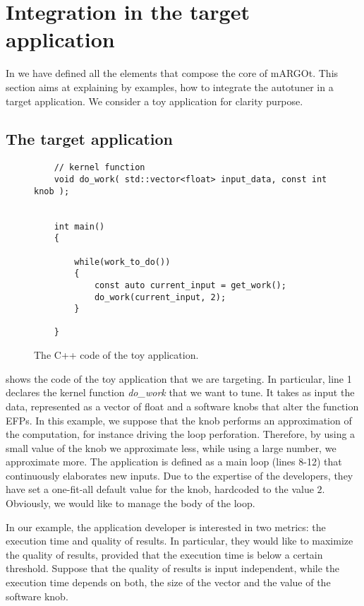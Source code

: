 \section{Integration in the target application}
\label{sec:integration}

In  we have defined all the elements that compose the core of mARGOt.
This section aims at explaining by examples, how to integrate the autotuner in a target application.
We consider a toy application for clarity purpose.

\subsection{The target application}

\begin{figure}[!t]
	\centering
	\lstset{language=MyCPP}
	\begin{lstlisting}
	// kernel function
	void do_work( std::vector<float> input_data, const int knob );
	
	
	int main()
	{
	
		while(work_to_do())
		{
			const auto current_input = get_work();
			do_work(current_input, 2);
		}
	
	}
	\end{lstlisting}
	\caption{The C++ code of the toy application.}
	\label{fig:toy_application}
\end{figure}

 shows the code of the toy application that we are targeting.
In particular, line 1 declares the kernel function \textit{do\_work} that we want to tune.
It takes as input the data, represented as a vector of float and a software knobs that alter the function EFPs.
In this example, we suppose that the knob performs an approximation of the computation, for instance driving the loop perforation.
Therefore, by using a small value of the knob we approximate less, while using a large number, we approximate more.
The application is defined as a main loop (lines 8-12) that continuously elaborates new inputs.
Due to the expertise of the developers, they have set a one-fit-all default value for the knob, hardcoded to the value $2$.
Obviously, we would like to manage the body of the loop.

In our example, the application developer is interested in two metrics: the execution time and quality of results.
In particular, they would like to maximize the quality of results, provided that the execution time is below a certain threshold.
Suppose that the quality of results is input independent, while the execution time depends on both, the size of the vector and the value of the software knob.


